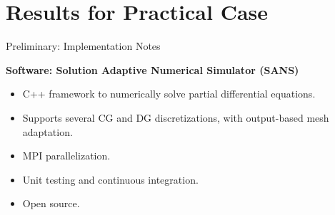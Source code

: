\documentclass{beamer}
\newcounter{sectionframes}
\newcommand{\setsectionframes}[1]{%
  \setcounter{sectionframes}{#1}%
}
\newcounter{sectionframecount}
\begin{document}
\begin{frame}[plain, t]

\end{frame}

\section{Results for Practical Case}

\setsectionframes{8}


\begin{frame}[t]{Preliminary: Implementation Notes}

\textbf{Software: Solution Adaptive Numerical Simulator (SANS)\footnotemark}
\begin{itemize}
  \item C++ framework to numerically solve partial differential equations.
  \item Supports several CG and DG discretizations, with output-based mesh adaptation.
  \item MPI parallelization.
  \item Unit testing and continuous integration.
  \item Open source.
\end{itemize}


\end{frame}
\end{document}
